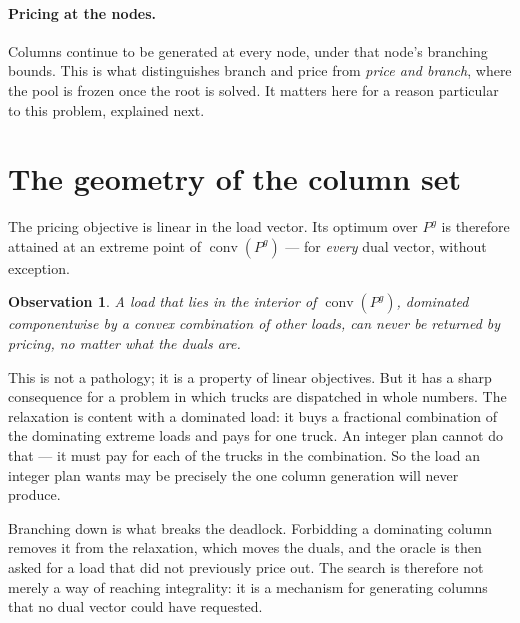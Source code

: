 \documentclass[11pt,a4paper]{article}
\newcommand{\conv}{\operatorname{conv}}
\newtheorem{observation}{Observation}
\begin{document}
\paragraph{Pricing at the nodes.} Columns continue to be generated at every
node, under that node's branching bounds. This is what distinguishes branch and
price from \emph{price and branch}, where the pool is frozen once the root is
solved. It matters here for a reason particular to this problem, explained next.

\section{The geometry of the column set}

The pricing objective is linear in the load vector. Its optimum over $P^{g}$ is
therefore attained at an extreme point of $\conv(P^{g})$ --- for \emph{every}
dual vector, without exception.

\begin{observation}
A load that lies in the interior of $\conv(P^{g})$, dominated componentwise by a
convex combination of other loads, can never be returned by pricing, no matter
what the duals are.
\end{observation}

This is not a pathology; it is a property of linear objectives. But it has a
sharp consequence for a problem in which trucks are dispatched in whole numbers.
The relaxation is content with a dominated load: it buys a fractional
combination of the dominating extreme loads and pays for one truck. An integer
plan cannot do that --- it must pay for each of the trucks in the combination.
So the load an integer plan wants may be precisely the one column generation
will never produce.

Branching down is what breaks the deadlock. Forbidding a dominating column
removes it from the relaxation, which moves the duals, and the oracle is then
asked for a load that did not previously price out. The search is therefore not
merely a way of reaching integrality: it is a mechanism for generating columns
that no dual vector could have requested.
\end{document}
